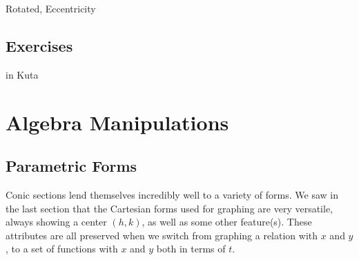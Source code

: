 

Rotated, Eccentricity

\newpage
\chapterminitoc

\newpage
{}
\newpage

\newpage
\subsection{Exercises}
in Kuta


\newpage
\section{Algebra Manipulations}
\noindent{}
\subsection{Parametric Forms}
Conic sections lend themselves incredibly well to a variety of forms.  We saw in the last 
section that the Cartesian forms used for graphing are very versatile, always showing
a center $(h,k)$, as well as some other feature(s).  These attributes are all preserved when
we switch from graphing a relation with $x$ and $y$, to a set of functions with $x$ and $y$
both in terms of $t$.  

